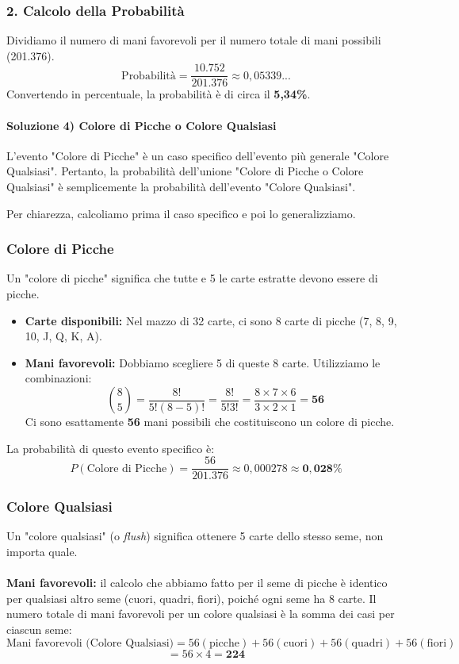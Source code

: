 \begin{esempio}
\subsubsection*{2. Calcolo della Probabilità}
Dividiamo il numero di mani favorevoli per il numero totale di mani possibili (201.376).
\[
\text{Probabilità} = \frac{10.752}{201.376} \approx 0,05339...
\]
Convertendo in percentuale, la probabilità è di circa il \textbf{5,34\%}.


\paragraph{Soluzione 4) Colore di Picche o Colore Qualsiasi}

L'evento "Colore di Picche" è un caso specifico dell'evento più generale "Colore Qualsiasi". Pertanto, la probabilità dell'unione "Colore di Picche o Colore Qualsiasi" è semplicemente la probabilità dell'evento "Colore Qualsiasi".

Per chiarezza, calcoliamo prima il caso specifico e poi lo generalizziamo.

\subsubsection*{Colore di Picche}
Un "colore di picche" significa che tutte e 5 le carte estratte devono essere di picche.

\begin{itemize}
    \item \textbf{Carte disponibili:} Nel mazzo di 32 carte, ci sono 8 carte di picche (7, 8, 9, 10, J, Q, K, A).
    \item \textbf{Mani favorevoli:} Dobbiamo scegliere 5 di queste 8 carte. Utilizziamo le combinazioni:
    \[
    \binom{8}{5} = \frac{8!}{5!(8-5)!} = \frac{8!}{5!3!} = \frac{8 \times 7 \times 6}{3 \times 2 \times 1} = \mathbf{56}
    \]
    Ci sono esattamente \textbf{56} mani possibili che costituiscono un colore di picche.
\end{itemize}

La probabilità di questo evento specifico è:
\[
P(\text{Colore di Picche}) = \frac{56}{201.376} \approx 0,000278 \approx \mathbf{0,028\%}
\]

\subsubsection*{Colore Qualsiasi}
Un "colore qualsiasi" (o \textit{flush}) significa ottenere 5 carte dello stesso seme, non importa quale. 
\\\\\textbf{Mani favorevoli:} il calcolo che abbiamo fatto per il seme di picche è identico per qualsiasi altro seme (cuori, quadri, fiori), poiché ogni seme ha 8 carte. Il numero totale di mani favorevoli per un colore qualsiasi è la somma dei casi per ciascun seme:
    \[
    \text{Mani favorevoli (Colore Qualsiasi)} = 56 (\text{picche}) + 56 (\text{cuori}) + 56 (\text{quadri}) + 56 (\text{fiori})
    \]
    \[
    = 56 \times 4 = \mathbf{224}
    \]


\end{esempio}

